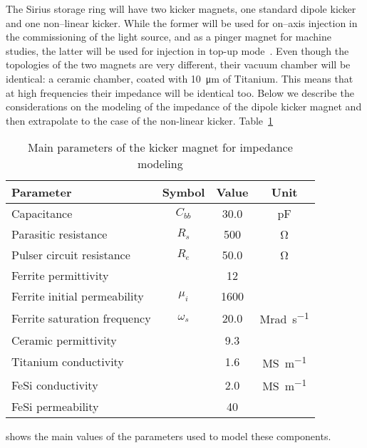     The Sirius storage ring will have two kicker magnets, one standard dipole kicker and one non--linear kicker. While the former will be used for on--axis injection in the commissioning of the light source, and as a pinger magnet for machine studies, the latter will be used for injection in top-up mode~\cite{Liu2016a}. Even though the topologies of the two magnets are very different, their vacuum chamber will be identical: a ceramic chamber, coated with \SI{10}{\micro\meter} of Titanium. This means that at high frequencies their impedance will be identical too. Below we describe the considerations on the modeling of the impedance of the dipole kicker magnet and then extrapolate to the case of the non-linear kicker. Table~\ref{tab:kicker_paramters}
    \begin{table}
        \centering
        \caption{Main parameters of the kicker magnet for impedance modeling}
        \label{tab:kicker_paramters}
        \begin{tabular}{lccc}
            \toprule
            Parameter                     & Symbol    & Value  & Unit \\
            \midrule
            Capacitance                   & $C_{bb}$  &  30.0  & \si{\pico\farad}\\
            Parasitic resistance          & $R_s$     &  500   & \si{\ohm}\\
            Pulser circuit resistance     & $R_e$     &  50.0  & \si{\ohm}\\
            Ferrite permittivity          &           &   12   & \\
            Ferrite initial permeability  & $\mu_i$   &  1600  & \\
            Ferrite saturation frequency  & $\omega_s$&  20.0  & \si{\mega\radian\per\second}\\
            Ceramic permittivity          &           &  9.3   & \\
            Titanium conductivity         &           &  1.6   & \si{\mega\siemens\per\meter}\\
            FeSi conductivity             &           &  2.0   & \si{\mega\siemens\per\meter}\\
            FeSi permeability             &           & 40     & \\
            \bottomrule
        \end{tabular}
    \end{table}
    shows the main values of the parameters used to model these components.

